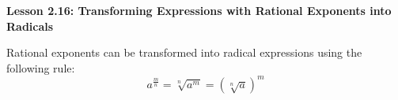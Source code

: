 \begin{center}
\textbf{Lesson 2.16: Transforming Expressions with Rational Exponents into Radicals}
\end{center}

\vspace*{1ex}

Rational exponents can be transformed into radical expressions using the following rule:
\[
a^{\tfrac{m}{n}} = \sqrt[{\scriptstyle n}]{a^m} = (\sqrt[{\scriptstyle n}]{a})^m
\]


